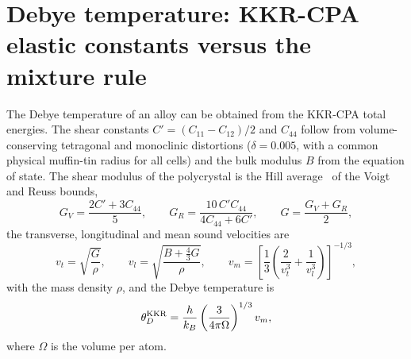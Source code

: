 \documentclass[aps,prb,preprint,superscriptaddress,floatfix]{revtex4-2}
\begin{document}
\clearpage
\section{Debye temperature: KKR-CPA elastic constants versus the mixture rule}
\label{sec:debye}

The Debye temperature of an alloy can be obtained from the KKR-CPA total energies. The shear
constants $C' = (C_{11}-C_{12})/2$ and $C_{44}$ follow from volume-conserving tetragonal and
monoclinic distortions ($\delta = 0.005$, with a common physical muffin-tin radius for all
cells) and the bulk modulus $B$ from the equation of state. The shear modulus of the
polycrystal is the Hill average~\cite{Hill1952} of the Voigt and Reuss bounds,
\begin{equation}
  G_V = \frac{2C' + 3C_{44}}{5},\qquad
  G_R = \frac{10\,C' C_{44}}{4C_{44} + 6C'},\qquad
  G = \frac{G_V + G_R}{2},
\end{equation}
the transverse, longitudinal and mean sound velocities are
\begin{equation}
  v_t = \sqrt{\frac{G}{\rho}},\qquad
  v_l = \sqrt{\frac{B + \tfrac{4}{3}G}{\rho}},\qquad
  v_m = \left[\frac{1}{3}\left(\frac{2}{v_t^3} + \frac{1}{v_l^3}\right)\right]^{-1/3},
\end{equation}
with the mass density $\rho$, and the Debye temperature is~\cite{Anderson1963}
\begin{equation}
  \theta_D^{\rm KKR} = \frac{h}{k_B}\left(\frac{3}{4\pi\Omega}\right)^{1/3} v_m ,
\end{equation}
where $\Omega$ is the volume per atom.
\end{document}
